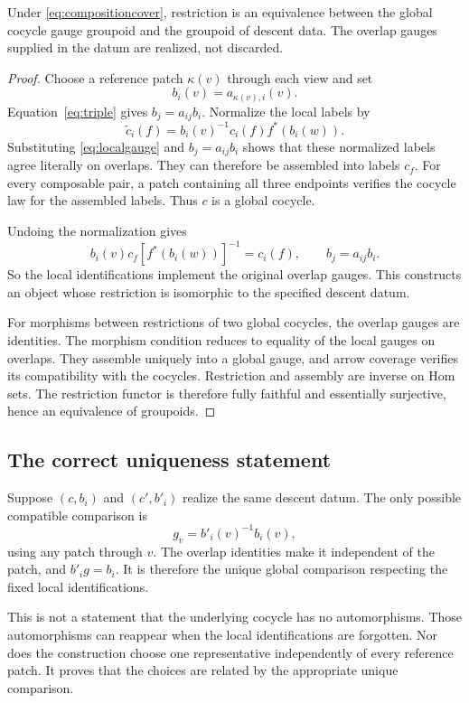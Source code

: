 \begin{theorem}\label{KS34}
Under \eqref{eq:compositioncover}, restriction is an equivalence between the global cocycle gauge groupoid and the groupoid of descent data. The overlap gauges supplied in the datum are realized, not discarded.
\end{theorem}
\begin{proof}
Choose a reference patch \(\kappa(v)\) through each view and set
\[
 b_i(v)=a_{\kappa(v),i}(v).
\]
Equation~\eqref{eq:triple} gives \(b_j=a_{ij}b_i\). Normalize the local labels by
\[
 \widetilde c_i(f)=b_i(v)^{-1}c_i(f)f^*(b_i(w)).
\]
Substituting \eqref{eq:localgauge} and \(b_j=a_{ij}b_i\) shows that these normalized labels agree literally on overlaps. They can therefore be assembled into labels \(c_f\). For every composable pair, a patch containing all three endpoints verifies the cocycle law for the assembled labels. Thus \(c\) is a global cocycle.

Undoing the normalization gives
\[
 b_i(v)c_f[f^*(b_i(w))]^{-1}=c_i(f),\qquad b_j=a_{ij}b_i.
\]
So the local identifications implement the original overlap gauges. This constructs an object whose restriction is isomorphic to the specified descent datum.

For morphisms between restrictions of two global cocycles, the overlap gauges are identities. The morphism condition reduces to equality of the local gauges on overlaps. They assemble uniquely into a global gauge, and arrow coverage verifies its compatibility with the cocycles. Restriction and assembly are inverse on Hom sets. The restriction functor is therefore fully faithful and essentially surjective, hence an equivalence of groupoids.
\end{proof}

\subsection{The correct uniqueness statement}
Suppose \((c,b_i)\) and \((c',b'_i)\) realize the same descent datum. The only possible compatible comparison is
\[
 g_v=b'_i(v)^{-1}b_i(v),
\]
using any patch through \(v\). The overlap identities make it independent of the patch, and \(b'_ig=b_i\). It is therefore the unique global comparison respecting the fixed local identifications.

This is not a statement that the underlying cocycle has no automorphisms. Those automorphisms can reappear when the local identifications are forgotten. Nor does the construction choose one representative independently of every reference patch. It proves that the choices are related by the appropriate unique comparison.

